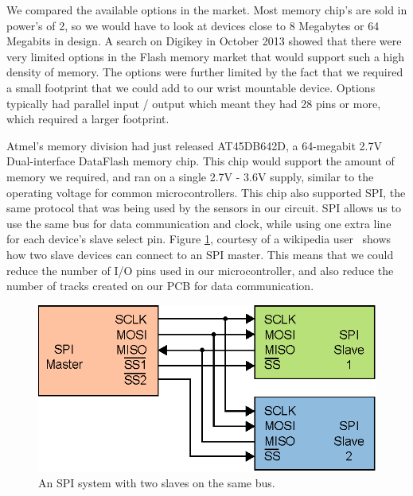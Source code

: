 We compared the available options in the market. Most memory chip's are sold in power's of 2, so we would have to look at devices close to 8 Megabytes or 64 Megabits in design.
A search on Digikey \cite{Web:DigiKeyWebsite} in October 2013 showed that there were very limited options in the Flash memory market that would support such a high density of memory. The options were further limited by the fact that we required a small footprint that we could add to our wrist mountable device. Options typically had parallel input / output which meant they had 28 pins or more, which required a larger footprint.

Atmel's memory division had just released AT45DB642D, a 64-megabit 2.7V Dual-interface DataFlash memory chip. This chip would support the amount of memory we required, and ran on a single 2.7V - 3.6V supply, similar to the operating voltage for common microcontrollers. This chip also supported SPI, the same protocol that was being used by the sensors in our circuit. SPI allows us to use the same bus for data communication and clock, while using one extra line for each device's slave select pin. Figure \ref{Fig:SPISLAVES}, courtesy of a wikipedia user~\cite{Web:WikiCBurnett} shows how two slave devices can connect to an SPI master. This means that we could reduce the number of I/O pins used in our microcontroller, and also reduce the number of tracks created on our PCB for data communication.

\begin{figure}
\begin{center}
\includegraphics{images/SPI_SLAVES.eps}
\caption{An SPI system with two slaves on the same bus.}
\label{Fig:SPISLAVES}
\end{center}
\end{figure}

